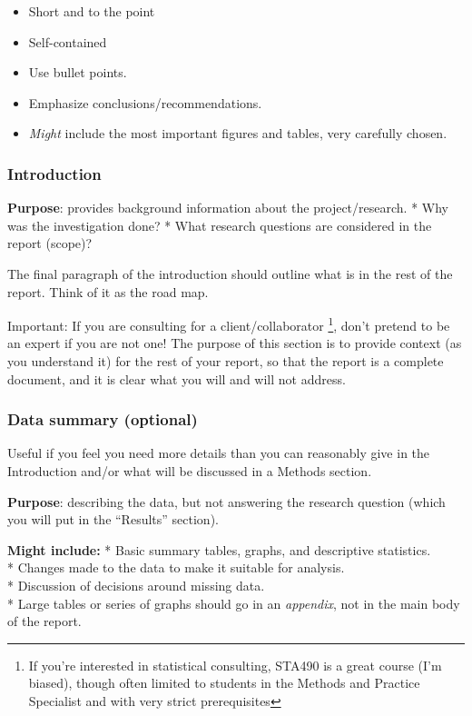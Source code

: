 \documentclass[
  openany]{book}
\providecommand{\tightlist}{%
  \setlength{\itemsep}{0pt}\setlength{\parskip}{0pt}}
\begin{document}
\begin{itemize}
\tightlist
\item
  Short and to the point
\item
  Self-contained
\item
  Use bullet points.
\item
  Emphasize conclusions/recommendations.
\item
  \emph{Might} include the most important figures and tables, very carefully chosen.
\end{itemize}

\hypertarget{introreport}{%
\subsubsection{Introduction}\label{introreport}}

\textbf{Purpose}: provides background information about the project/research.
* Why was the investigation done?
* What research questions are considered in the report (scope)?

The final paragraph of the introduction should outline what is in the rest of the report. Think of it as the road map.

Important: If you are consulting for a client/collaborator \footnote{If you're interested in statistical consulting, STA490 is a great course (I'm biased), though often limited to students in the Methods and Practice Specialist and with very strict prerequisites}, don't pretend to be an expert if you are not one! The purpose of this section is to provide context (as you understand it) for the rest of your report, so that the report is a complete document, and it is clear what you will and will not address.

\hypertarget{data-summary-optional}{%
\subsubsection{Data summary (optional)}\label{data-summary-optional}}

Useful if you feel you need more details than you can reasonably give in the Introduction and/or what will be discussed in a Methods section.

\textbf{Purpose}: describing the data, but not answering the research question (which you will put in the ``Results'' section).

\textbf{Might include:}
* Basic summary tables, graphs, and descriptive statistics.\\
* Changes made to the data to make it suitable for analysis.\\
* Discussion of decisions around missing data.\\
* Large tables or series of graphs should go in an \emph{appendix}, not in the main body of the report.
\end{document}
